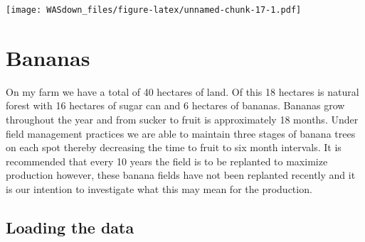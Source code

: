 \documentclass[]{book}
\newenvironment{Shaded}{\begin{snugshade}}{\end{snugshade}}
\newcommand{\KeywordTok}[1]{\textcolor[rgb]{0.13,0.29,0.53}{\textbf{{#1}}}}
\newcommand{\DataTypeTok}[1]{\textcolor[rgb]{0.13,0.29,0.53}{{#1}}}
\newcommand{\DecValTok}[1]{\textcolor[rgb]{0.00,0.00,0.81}{{#1}}}
\newcommand{\StringTok}[1]{\textcolor[rgb]{0.31,0.60,0.02}{{#1}}}
\newcommand{\CommentTok}[1]{\textcolor[rgb]{0.56,0.35,0.01}{\textit{{#1}}}}
\newcommand{\NormalTok}[1]{{#1}}
\theoremstyle{definition}
\theoremstyle{definition}
\theoremstyle{remark}
\begin{document}
\begin{Shaded}
\end{Shaded}

\texttt{[image: WASdown\_files/figure-latex/unnamed-chunk-17-1.pdf]}

\chapter{Bananas}\label{bananas}

On my farm we have a total of 40 hectares of land. Of this 18 hectares
is natural forest with 16 hectares of sugar can and 6 hectares of
bananas. Bananas grow throughout the year and from sucker to fruit is
approximately 18 months. Under field management practices we are able to
maintain three stages of banana trees on each spot thereby decreasing
the time to fruit to six month intervals. It is recommended that every
10 years the field is to be replanted to maximize production however,
these banana fields have not been replanted recently and it is our
intention to investigate what this may mean for the production.

\section{Loading the data}\label{loading-the-data-1}
\end{document}
